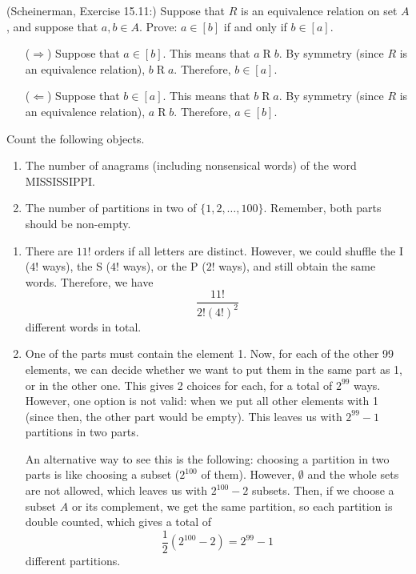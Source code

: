 \documentclass{article}
\theoremstyle{definition}
\begin{document}
\begin{question}
    (Scheinerman, Exercise 15.11:)
    Suppose that $R$ is an equivalence relation on  set $A$, and suppose that $a, b \in A$.
    Prove: $a \in [b]$ if and only if $b \in [a]$.
\end{question}
\begin{solution}
    \begin{itemize}
    \item[($\Rightarrow$)] Suppose that $a \in [b]$.  This means that $a\mathrel{R}b$.  By symmetry (since $R$ is an equivalence relation), $b\mathrel{R}a$.  Therefore, $b \in [a]$.
    \item[($\Leftarrow$)] Suppose that $b \in [a]$.  This means that $b\mathrel{R}a$.  By symmetry (since $R$ is an equivalence relation), $a\mathrel{R}b$.  Therefore, $a \in [b]$.
    \end{itemize}
\end{solution}


\begin{question}
    Count the following objects.
    	\begin{enumerate}
    	\item The number of anagrams (including nonsensical words) of the word MISSISSIPPI.
   	 \item The number of partitions in two of $\{1, 2, \dots, 100 \}$. Remember, both parts should be non-empty.
   	\end{enumerate}
\end{question}
\begin{solution}
    	\begin{enumerate}
    	\item There are $11!$ orders if all letters are distinct. However, we could shuffle the I ($4!$ ways), the S ($4!$ ways), or the P ($2!$ ways), and still obtain the same words. Therefore, we have
	\[
	\frac{11!}{2! (4!)^2}
	\]
	different words in total.
   	 \item One of the parts must contain the element 1. Now, for each of the other 99 elements, we can decide whether we want to put them in the same part as 1, or in the other one. This gives 2 choices for each, for a total of $2^{99}$ ways. However, one option is not valid: when we put all other elements with 1 (since then, the other part would be empty). This leaves us with $2^{99} - 1$ partitions in two parts.
	
	An alternative way to see this is the following: choosing a partition in two parts is like choosing a subset ($2^{100}$ of them). However, $\emptyset$ and the whole sets are not allowed, which leaves us with $2^{100} - 2$ subsets. Then, if we choose a subset $A$ or its complement, we get the same partition, so each partition is double counted, which gives a total of
	\[
	\frac12 \left ( 2^{100} - 2 \right ) = 2^{99} - 1
	\]
	different partitions.
   	\end{enumerate}
\end{solution}
\end{document}

